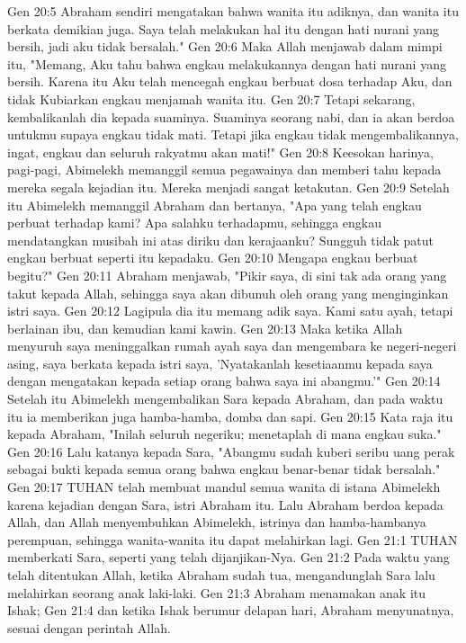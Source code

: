 Gen 20:5  Abraham sendiri mengatakan bahwa wanita itu adiknya, dan wanita itu berkata demikian juga. Saya telah melakukan hal itu dengan hati nurani yang bersih, jadi aku tidak bersalah."
Gen 20:6  Maka Allah menjawab dalam mimpi itu, "Memang, Aku tahu bahwa engkau melakukannya dengan hati nurani yang bersih. Karena itu Aku telah mencegah engkau berbuat dosa terhadap Aku, dan tidak Kubiarkan engkau menjamah wanita itu.
Gen 20:7  Tetapi sekarang, kembalikanlah dia kepada suaminya. Suaminya seorang nabi, dan ia akan berdoa untukmu supaya engkau tidak mati. Tetapi jika engkau tidak mengembalikannya, ingat, engkau dan seluruh rakyatmu akan mati!"
Gen 20:8  Keesokan harinya, pagi-pagi, Abimelekh memanggil semua pegawainya dan memberi tahu kepada mereka segala kejadian itu. Mereka menjadi sangat ketakutan.
Gen 20:9  Setelah itu Abimelekh memanggil Abraham dan bertanya, "Apa yang telah engkau perbuat terhadap kami? Apa salahku terhadapmu, sehingga engkau mendatangkan musibah ini atas diriku dan kerajaanku? Sungguh tidak patut engkau berbuat seperti itu kepadaku.
Gen 20:10  Mengapa engkau berbuat begitu?"
Gen 20:11  Abraham menjawab, "Pikir saya, di sini tak ada orang yang takut kepada Allah, sehingga saya akan dibunuh oleh orang yang menginginkan istri saya.
Gen 20:12  Lagipula dia itu memang adik saya. Kami satu ayah, tetapi berlainan ibu, dan kemudian kami kawin.
Gen 20:13  Maka ketika Allah menyuruh saya meninggalkan rumah ayah saya dan mengembara ke negeri-negeri asing, saya berkata kepada istri saya, 'Nyatakanlah kesetiaanmu kepada saya dengan mengatakan kepada setiap orang bahwa saya ini abangmu.'"
Gen 20:14  Setelah itu Abimelekh mengembalikan Sara kepada Abraham, dan pada waktu itu ia memberikan juga hamba-hamba, domba dan sapi.
Gen 20:15  Kata raja itu kepada Abraham, "Inilah seluruh negeriku; menetaplah di mana engkau suka."
Gen 20:16  Lalu katanya kepada Sara, "Abangmu sudah kuberi seribu uang perak sebagai bukti kepada semua orang bahwa engkau benar-benar tidak bersalah."
Gen 20:17  TUHAN telah membuat mandul semua wanita di istana Abimelekh karena kejadian dengan Sara, istri Abraham itu. Lalu Abraham berdoa kepada Allah, dan Allah menyembuhkan Abimelekh, istrinya dan hamba-hambanya perempuan, sehingga wanita-wanita itu dapat melahirkan lagi.
Gen 21:1  TUHAN memberkati Sara, seperti yang telah dijanjikan-Nya.
Gen 21:2  Pada waktu yang telah ditentukan Allah, ketika Abraham sudah tua, mengandunglah Sara lalu melahirkan seorang anak laki-laki.
Gen 21:3  Abraham menamakan anak itu Ishak;
Gen 21:4  dan ketika Ishak berumur delapan hari, Abraham menyunatnya, sesuai dengan perintah Allah.
